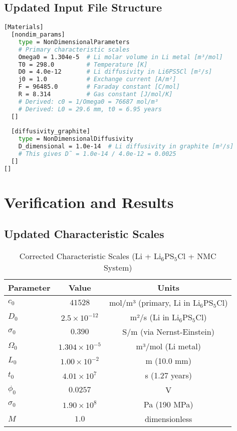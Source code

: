 \documentclass[11pt,a4paper]{article}
\begin{document}
\subsection{Updated Input File Structure}

\begin{lstlisting}[language=bash, caption=MOOSE Input File Example with Corrected Scales]
[Materials]
  [nondim_params]
    type = NonDimensionalParameters
    # Primary characteristic scales
    Omega0 = 1.304e-5  # Li molar volume in Li metal [m³/mol]
    T0 = 298.0         # Temperature [K]
    D0 = 4.0e-12       # Li diffusivity in Li6PS5Cl [m²/s]
    j0 = 1.0           # Exchange current [A/m²]
    F = 96485.0        # Faraday constant [C/mol]
    R = 8.314          # Gas constant [J/mol/K]
    # Derived: c0 = 1/Omega0 = 76687 mol/m³
    # Derived: L0 = 29.6 mm, t0 = 6.95 years
  []
  
  [diffusivity_graphite]
    type = NonDimensionalDiffusivity
    D_dimensional = 1.0e-14  # Li diffusivity in graphite [m²/s]
    # This gives D̃ = 1.0e-14 / 4.0e-12 = 0.0025
  []
[]
\end{lstlisting}

\section{Verification and Results}

\subsection{Updated Characteristic Scales}

\begin{table}[H]
\centering
\caption{Corrected Characteristic Scales (Li + Li$_6$PS$_5$Cl + NMC System)}
\begin{tabular}{@{}lcc@{}}
\toprule
Parameter & Value & Units \\
\midrule
$c_0$ & $41528$ & mol/m³ (primary, Li in Li$_6$PS$_5$Cl) \\
$D_0$ & $2.5 \times 10^{-12}$ & m²/s (Li in Li$_6$PS$_5$Cl) \\
$\sigma_0$ & $0.390$ & S/m (via Nernst-Einstein) \\
$\Omega_0$ & $1.304 \times 10^{-5}$ & m³/mol (Li metal) \\
$L_0$ & $1.00 \times 10^{-2}$ & m (10.0 mm) \\
$t_0$ & $4.01 \times 10^{7}$ & s (1.27 years) \\
$\phi_0$ & $0.0257$ & V \\
$\sigma_0$ & $1.90 \times 10^{8}$ & Pa (190 MPa) \\
$M$ & $1.0$ & dimensionless \\
\bottomrule
\end{tabular}
\label{tab:corrected_scales}
\end{table}
\end{document}
